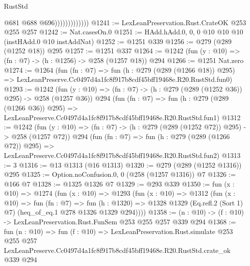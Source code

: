 \begin{lexlean}{RustStd}
\begin{coremodule}
                              @681
                              @688
                              @696)))))))))))))
@1241 := LexLeanPreservation.Rust.CrateOK @253 @255 @257
@1242 := Nat.casesOn.{0}
@1251 := HAdd.hAdd.{0, 0, 0} @10 @10 @10 (instHAdd.{0} @10 instAddNat)
@1252 := @1251 @339
@1256 := @279 (@289 (@1252 @18)) @295
@1257 := @1251 @337
@1264 := @1242 (fun (y : @10) => (fn : @7) -> (h : @1256) -> @258 (@1257 @18)) @294
@1266 := @1251 Nat.zero
@1274 := @1264
    (fun (fn : @7) =>
    fun (h : @279 (@289 (@1266 @18)) @295) =>
    LexLeanPreserve.Cc0497d4a1fc8f917b8cdf45bff19468e.R20.RustStd.fun0)
@1293 := @1242
    (fun (y : @10) => (fn : @7) -> (h : @279 (@289 (@1252 @36)) @295) -> @258 (@1257 @36))
    @294
    (fun (fn : @7) =>
    fun (h : @279 (@289 (@1266 @36)) @295) =>
    LexLeanPreserve.Cc0497d4a1fc8f917b8cdf45bff19468e.R20.RustStd.fun1)
@1312 := @1242
    (fun (y : @10) => (fn : @7) -> (h : @279 (@289 (@1252 @72)) @295) -> @258 (@1257 @72))
    @294
    (fun (fn : @7) =>
    fun (h : @279 (@289 (@1266 @72)) @295) =>
    LexLeanPreserve.Cc0497d4a1fc8f917b8cdf45bff19468e.R20.RustStd.fun2)
@1313 := 3
@1316 := @13 @1313 (@16 @1313)
@1320 := @279 (@289 (@1252 @1316)) @295
@1325 := Option.noConfusion.{0, 0} (@258 (@1257 @1316)) @7
@1326 := @166 @7
@1328 := @1325 @1326 @7
@1329 := @293 @339
@1350 := fun (x : @10) =>
  @1274
    (fun (x : @10) =>
    @1293
      (fun (x : @10) =>
      @1312
        (fun (x : @10) =>
        fun (fn : @7) =>
        fun (h : @1320) =>
        @1328 @1329 (Eq.refl.{2} (Sort 1) @7) (heq_of_eq.{1} @278 @1326 @1329 @294))))
@1358 := (n : @10) -> (f : @10) -> LexLeanPreservation.Rust.FunSem @253 @255 @257 @339 @294
@1368 := fun (n : @10) =>
  fun (f : @10) =>
  LexLeanPreservation.Rust.simulate
    @253
    @255
    @257
    LexLeanPreserve.Cc0497d4a1fc8f917b8cdf45bff19468e.R20.RustStd.crate_ok
    @339
    @294
\end{coremodule}
\end{lexlean}
